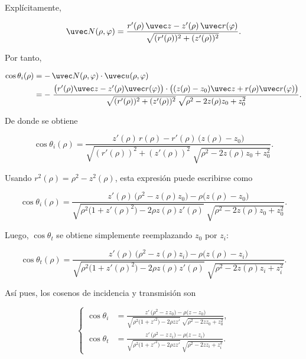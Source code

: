 Explícitamente,

\begin{equation}
  \uvec N(\rho,\varphi)
  =
  \frac{
  r'(\rho)\,\uvec z
  -
  z'(\rho)\,\uvec r(\varphi)
  }
  {
  \sqrt{(r'(\rho))^2+(z'(\rho))^2}
  }.
\label{eq:N_ovoid_rho_phi_explicit}
\end{equation}

Por tanto,

\begin{align}
\cos\theta_i(\rho)
&=
-\,\uvec N(\rho,\varphi)\cdot\uvec u(\rho,\varphi)
\label{eq:cos_theta_i_def_app}
\\
&=
-\;
\frac{
\big(r'(\rho)\uvec z-z'(\rho)\uvec r(\varphi)\big)
\cdot
\big((z(\rho)-z_0)\uvec z+r(\rho)\uvec r(\varphi)\big)
}
{
\sqrt{(r'(\rho))^2+(z'(\rho))^2}\;
\sqrt{\rho^2-2z(\rho)z_0+z_0^2}
}.
\label{eq:cos_theta_i_closed_app}
\end{align}

De donde se obtiene

\begin{equation}
  \cos\theta_i(\rho)
  =
  \frac{
  z'(\rho)\,r(\rho)
  -
  r'(\rho)\,\big(z(\rho)-z_0\big)
  }
  {
  \sqrt{(r'(\rho))^2+(z'(\rho))^2}\;
  \sqrt{\rho^2-2z(\rho)z_0+z_0^2}
  }.
  \label{eq:cos_theta_i_ovoid_z_and_r}
\end{equation}

Usando $r^2(\rho)=\rho^2-z^2(\rho)$, esta expresión puede escribirse como

\begin{equation}
\cos\theta_i(\rho)
=
\frac{
z'(\rho)\,\big(\rho^2-z(\rho)z_0\big)
-
\rho\big(z(\rho)-z_0\big)
}
{
\sqrt{\rho^2\big(1+z'(\rho)^2\big)-2\rho z(\rho)z'(\rho)}
\;
\sqrt{\rho^2-2z(\rho)z_0+z_0^2}
}.
\label{eq:cos_theta_i_ovoid}
\end{equation}

Luego, $\cos\theta_t$ se obtiene simplemente reemplazando $z_0$ por $z_i$:

\begin{equation}
\cos\theta_t(\rho)
=
\frac{
z'(\rho)\,\big(\rho^2-z(\rho)z_i\big)
-
\rho\big(z(\rho)-z_i\big)
}
{
\sqrt{\rho^2\big(1+z'(\rho)^2\big)-2\rho z(\rho)z'(\rho)}
\;
\sqrt{\rho^2-2z(\rho)z_i+z_i^2}
}.
\label{eq:cos_theta_t_ovoid}
\end{equation}

Así pues, los cosenos de incidencia y transmisión son

\begin{equation}
\left\{
\begin{aligned}
\cos\theta_i
&=
\frac{
z'\,\big(\rho^2 - z\,z_0\big) - \rho\big(z - z_0\big)
}
{
\sqrt{\rho^2\big(1+z'^2\big) - 2\rho z z'}\;
\sqrt{\rho^2 - 2 z z_0 + z_0^2}
},
\\
\cos\theta_t
&=
\frac{
z'\,\big(\rho^2 - z\,z_i\big) - \rho\big(z - z_i\big)
}
{
\sqrt{\rho^2\big(1+z'^2\big) - 2\rho z z'}\;
\sqrt{\rho^2 - 2 z z_i + z_i^2}
}.
\end{aligned}
\right.
\label{cosines_ovoid_compact}
\end{equation}

